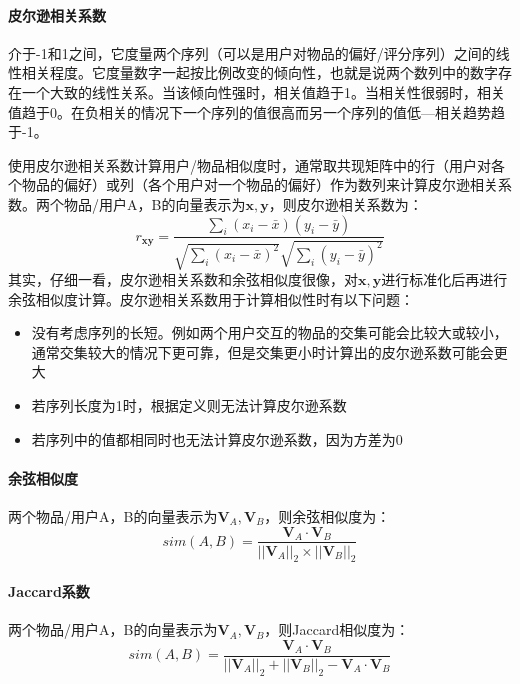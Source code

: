 \paragraph{皮尔逊相关系数}
介于-1和1之间，它度量两个序列（可以是用户对物品的偏好/评分序列）之间的线性相关程度。它度量数字一起按比例改变的倾向性，也就是说两个数列中的数字存在一个大致的线性关系。当该倾向性强时，相关值趋于1。当相关性很弱时，相关值趋于0。在负相关的情况下一个序列的值很高而另一个序列的值低---相关趋势趋于-1。

使用皮尔逊相关系数计算用户/物品相似度时，通常取共现矩阵中的行（用户对各个物品的偏好）或列（各个用户对一个物品的偏好）作为数列来计算皮尔逊相关系数。两个物品/用户A，B的向量表示为$\boldsymbol{x}, \boldsymbol{y}$，则皮尔逊相关系数为：
$$
r_{\boldsymbol{xy}} = \frac{\sum_i (x_i - \bar{x})(y_i - \bar{y})}{\sqrt{\sum_i (x_i - \bar{x})^2} \sqrt{\sum_i (y_i - \bar{y})^2}}
$$
其实，仔细一看，皮尔逊相关系数和余弦相似度很像，对$\boldsymbol{x}, \boldsymbol{y}$进行标准化后再进行余弦相似度计算。皮尔逊相关系数用于计算相似性时有以下问题：
\begin{itemize}
	\item 没有考虑序列的长短。例如两个用户交互的物品的交集可能会比较大或较小，通常交集较大的情况下更可靠，但是交集更小时计算出的皮尔逊系数可能会更大
	\item 若序列长度为1时，根据定义则无法计算皮尔逊系数
	\item 若序列中的值都相同时也无法计算皮尔逊系数，因为方差为0
\end{itemize}


\paragraph{余弦相似度}
两个物品/用户A，B的向量表示为$\boldsymbol{V}_A, \boldsymbol{V}_B$，则余弦相似度为：
$$
sim(A, B) = \frac{\boldsymbol{V}_A \cdot \boldsymbol{V}_B}{||\boldsymbol{V}_A||_2 \times ||\boldsymbol{V}_B||_2}
$$

\paragraph{Jaccard系数}
两个物品/用户A，B的向量表示为$\boldsymbol{V}_A, \boldsymbol{V}_B$，则Jaccard相似度为：
$$
sim(A, B) = \frac{\boldsymbol{V}_A \cdot \boldsymbol{V}_B}{||\boldsymbol{V}_A||_2 + ||\boldsymbol{V}_B||_2 - \boldsymbol{V}_A \cdot \boldsymbol{V}_B}
$$








